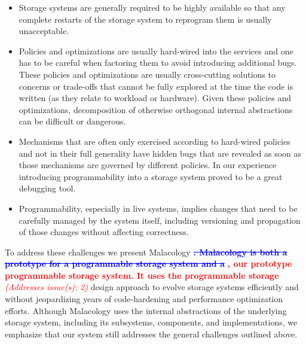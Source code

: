 \documentclass[preprint]{sigplanconf-eurosys}
\newcommand{\newcomment}[1]{{\textcolor{red}{\textbf{#1}}}}
\newcommand{\oldcomment}[1]{{\textcolor{blue}{\textbf{\sout{#1}}}}}
\newcommand{\addressesissue}[1]{{\textcolor{red}{{\it (Addresses issue(s): {#1})}}}}
\begin{document}
\begin{itemize}

\item Storage systems are generally required to be highly available so that any
complete restarts of the storage system to reprogram them is usually
unacceptable.

\item Policies and optimizations are usually hard-wired into the services and
one has to be careful when factoring them to avoid introducing additional bugs.
These policies and optimizations are usually cross-cutting solutions to
concerns or trade-offs that cannot be fully explored at the time the code is
written (as they relate to workload or hardware). Given these policies and
optimizations, decomposition of otherwise orthogonal internal abstractions can
be difficult or dangerous.

\item Mechanisms that are often only exercised according to hard-wired policies
and not in their full generality have hidden bugs that are revealed as soon as
those mechanisms are governed by different policies. In our experience
introducing programmability into a storage system proved to be a great
debugging tool.

\item Programmability, especially in live systems, implies changes that need to
be carefully managed by the system itself, including versioning and propagation
of those changes without affecting correctness.

\end{itemize}

To address these challenges we present Malacology
\oldcomment{. Malacology is both a prototype for a programmable storage system
and a}
\newcomment{, our prototype programmable storage system. It uses the
programmable storage}
\addressesissue{2}
design approach to evolve storage systems efficiently and
without jeopardizing years of code-hardening and performance optimization
efforts.  Although Malacology uses the internal abstractions of the underlying
storage system, including its subsystems, components, and implementations, we
emphasize that our system still addresses the general challenges outlined
above.
\end{document}

